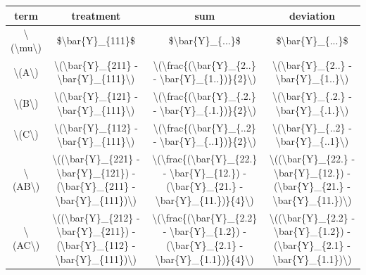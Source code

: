 \documentclass[
]{book}
\begin{document}
\begin{table}
\centering
\begin{tabular}{c|c|c|c}
\hline
term & treatment & sum & deviation\\
\hline
\textbackslash{}(\textbackslash{}mu\textbackslash{}) & \$\textbackslash{}bar\{Y\}\_\{111\}\$ & \$\textbackslash{}bar\{Y\}\_\{...\}\$ & \$\textbackslash{}bar\{Y\}\_\{...\}\$\\
\hline
\textbackslash{}(A\textbackslash{}) & \textbackslash{}(\textbackslash{}bar\{Y\}\_\{211\} - \textbackslash{}bar\{Y\}\_\{111\}\textbackslash{}) & \textbackslash{}(\textbackslash{}frac\{(\textbackslash{}bar\{Y\}\_\{2..\} - \textbackslash{}bar\{Y\}\_\{1..\})\}\{2\}\textbackslash{}) & \textbackslash{}(\textbackslash{}bar\{Y\}\_\{2..\} - \textbackslash{}bar\{Y\}\_\{1..\}\textbackslash{})\\
\hline
\textbackslash{}(B\textbackslash{}) & \textbackslash{}(\textbackslash{}bar\{Y\}\_\{121\} - \textbackslash{}bar\{Y\}\_\{111\}\textbackslash{}) & \textbackslash{}(\textbackslash{}frac\{(\textbackslash{}bar\{Y\}\_\{.2.\} - \textbackslash{}bar\{Y\}\_\{.1.\})\}\{2\}\textbackslash{}) & \textbackslash{}(\textbackslash{}bar\{Y\}\_\{.2.\} - \textbackslash{}bar\{Y\}\_\{.1.\}\textbackslash{})\\
\hline
\textbackslash{}(C\textbackslash{}) & \textbackslash{}(\textbackslash{}bar\{Y\}\_\{112\} - \textbackslash{}bar\{Y\}\_\{111\}\textbackslash{}) & \textbackslash{}(\textbackslash{}frac\{(\textbackslash{}bar\{Y\}\_\{..2\} - \textbackslash{}bar\{Y\}\_\{..1\})\}\{2\}\textbackslash{}) & \textbackslash{}(\textbackslash{}bar\{Y\}\_\{..2\} - \textbackslash{}bar\{Y\}\_\{..1\}\textbackslash{})\\
\hline
\textbackslash{}(AB\textbackslash{}) & \textbackslash{}((\textbackslash{}bar\{Y\}\_\{221\} - \textbackslash{}bar\{Y\}\_\{121\}) - (\textbackslash{}bar\{Y\}\_\{211\} - \textbackslash{}bar\{Y\}\_\{111\})\textbackslash{}) & \textbackslash{}(\textbackslash{}frac\{(\textbackslash{}bar\{Y\}\_\{22.\} - \textbackslash{}bar\{Y\}\_\{12.\}) - (\textbackslash{}bar\{Y\}\_\{21.\} - \textbackslash{}bar\{Y\}\_\{11.\})\}\{4\}\textbackslash{}) & \textbackslash{}((\textbackslash{}bar\{Y\}\_\{22.\} - \textbackslash{}bar\{Y\}\_\{12.\}) - (\textbackslash{}bar\{Y\}\_\{21.\} - \textbackslash{}bar\{Y\}\_\{11.\})\textbackslash{})\\
\hline
\textbackslash{}(AC\textbackslash{}) & \textbackslash{}((\textbackslash{}bar\{Y\}\_\{212\} - \textbackslash{}bar\{Y\}\_\{211\}) - (\textbackslash{}bar\{Y\}\_\{112\} - \textbackslash{}bar\{Y\}\_\{111\})\textbackslash{}) & \textbackslash{}(\textbackslash{}frac\{(\textbackslash{}bar\{Y\}\_\{2.2\} - \textbackslash{}bar\{Y\}\_\{1.2\}) - (\textbackslash{}bar\{Y\}\_\{2.1\} - \textbackslash{}bar\{Y\}\_\{1.1\})\}\{4\}\textbackslash{}) & \textbackslash{}((\textbackslash{}bar\{Y\}\_\{2.2\} - \textbackslash{}bar\{Y\}\_\{1.2\}) - (\textbackslash{}bar\{Y\}\_\{2.1\} - \textbackslash{}bar\{Y\}\_\{1.1\})\textbackslash{})\\

\end{tabular}
\end{table}
\end{document}
